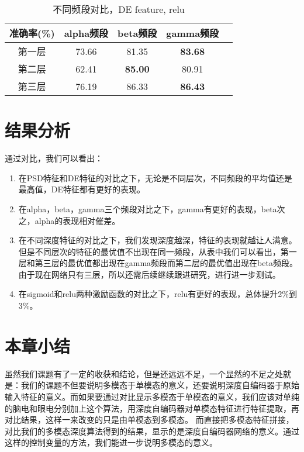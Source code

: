 		\begin{table}[!h]
	\centering
\begin{tabular}{|c|c|c|c|c|}
\hline
\hline
 准确率(\%) & alpha频段 & beta频段 & gamma频段\\
\hline
第一层 & 73.66	& 81.35 & \textbf{83.68}\\
\hline
第二层 & 62.41	& \textbf{85.00} & 80.91 \\
\hline
第三层 & 76.19	& 86.33 & \textbf{86.43}\\
\hline
\end{tabular}
\caption{不同频段对比，DE feature, relu}
\end{table} 

\section{结果分析}
	通过对比，我们可以看出：
	\begin{enumerate}
	\item 在PSD特征和DE特征的对比之下，无论是不同层次，不同频段的平均值还是最高值，DE特征都有更好的表现。
	\item 在alpha，beta，gamma三个频段对比之下，gamma有更好的表现，beta次之，alpha的表现相对催差。
	\item 在不同深度特征的对比之下，我们发现深度越深，特征的表现就越让人满意。但是不同层次的特征的最优值不出现在同一频段，从表中我们可以看出，第一层和第三层的最优值都出现在gamma频段而第二层的最优值出现在beta频段。由于现在网络只有三层，所以还需后续继续跟进研究，进行进一步测试。
	\item 在sigmoid和relu两种激励函数的对比之下，relu有更好的表现，总体提升2\%到3\%。
	\end{enumerate}
	\section{本章小结}
	虽然我们课题有了一定的收获和结论，但是还远远不足，一个显然的不足之处就是：我们的课题不但要说明多模态于单模态的意义，还要说明深度自编码器于原始输入特征的意义。而如果要通过对比显示多模态于单模态的意义，我们应该对单纯的脑电和眼电分别加上这个算法，用深度自编码器对单模态特征进行特征提取，再对比结果，这样一来改变的只是由单模态到多模态。 而直接把多模态特征拼接，对比我们的多模态深度算法得到的结果，显示的是深度自编码器网络的意义。通过这样的控制变量的方法，我们能进一步说明多模态的意义。

